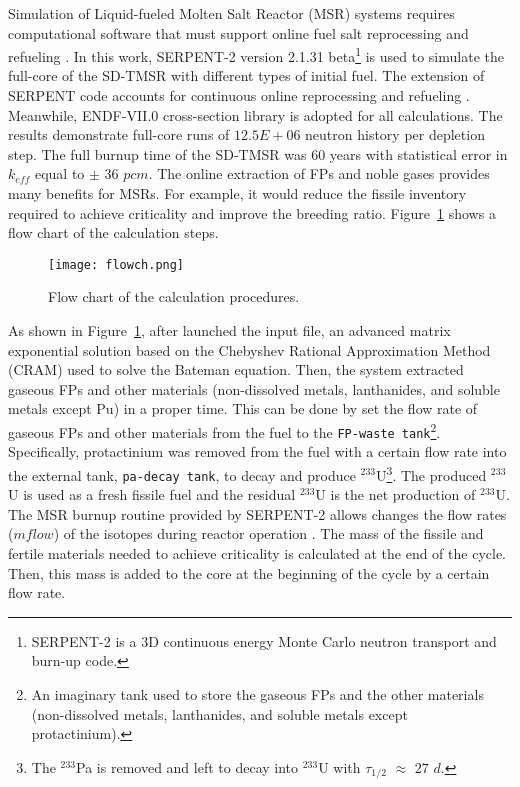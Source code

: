 Simulation of Liquid-fueled Molten Salt Reactor (MSR) systems requires computational software that must support online fuel salt reprocessing and refueling \cite{serp2014molten}. In this work, SERPENT-2 version 2.1.31 beta\footnote{SERPENT-2 is a \gls{3D} continuous energy Monte Carlo neutron transport and burn-up code.} \cite{leppanen2014serpent} is used to simulate the full-core of the SD-TMSR with different types of initial fuel. The extension of SERPENT code accounts for continuous online reprocessing and refueling \cite{aufiero2013extended}. Meanwhile, ENDF-VII.0 cross-section library is adopted for all calculations. The results demonstrate full-core runs of $12.5E+06$ neutron history per depletion step. The full burnup time of the SD-TMSR was 60 years with statistical error in $k_{eff}$ equal to $\pm$ $36$ $pcm$. The online extraction of \gls{FPs} and noble gases  provides many benefits for MSRs. For example, it would reduce the fissile inventory required to achieve criticality and improve the breeding ratio.
Figure~\ref{fig:flow} shows a flow chart of the calculation steps. 

\begin{figure}[t!] %
	\texttt{[image: flowch.png]}
	\caption{Flow chart of the calculation procedures.}
	\label{fig:flow}
\end{figure}

As shown in Figure~\ref{fig:flow}, after launched the input file, an advanced matrix exponential solution based on the Chebyshev Rational Approximation Method (CRAM) \cite{isotalo2016improving} used to solve the Bateman equation. Then, the system extracted gaseous \gls{FPs} and other materials (non-dissolved metals, lanthanides, and soluble metals except Pu) in a proper time. This can be done by set the flow rate of gaseous \gls{FPs} and other materials from the fuel to the \texttt{FP-waste tank}\footnote{An imaginary tank used to store the gaseous \gls{FPs} and the other materials (non-dissolved metals, lanthanides, and soluble metals except protactinium).}. Specifically, protactinium was removed from the fuel with a certain flow rate into the external tank, \texttt{pa-decay tank}, to decay and produce $^{233}$U\footnote{The $^{233}$Pa is removed and left to decay into $^{233}$U with $\tau_{1/2}$ $\approx$ $27$ $d$.}. The produced $^{233}$U is used as a fresh fissile fuel and the residual $^{233}$U is the net production of $^{233}$U. The MSR burnup routine provided by SERPENT-2 allows changes the flow rates ($mflow$) of the isotopes during reactor operation \cite{aufiero2013extended}. The mass of the fissile and fertile materials needed to achieve criticality is calculated at the end of the cycle. Then, this mass is added to the core at the beginning of the cycle by a certain flow rate.

